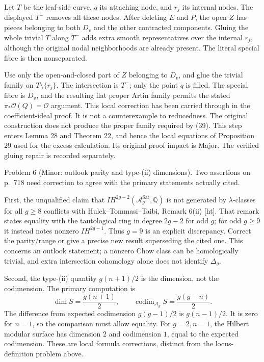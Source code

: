 \documentclass[10pt]{article}
\begin{document}
Let \(T\) be the leaf-side curve, \(q\) its attaching node, and \(r_j\) its internal nodes. The displayed \(T^-\) removes all these nodes. After deleting \(E\) and \(P\), the open \(Z\) has pieces belonging to both \(D_v\) and the other contracted components. Gluing the whole trivial \(T\) along \(T^-\) adds extra smooth representatives over the internal \(r_j\), although the original nodal neighborhoods are already present. The literal special fibre is then nonseparated.\par
Use only the open-and-closed part of \(Z\) belonging to \(D_v\), and glue the trivial family on \(T\setminus\{r_j\}\). The intersection is \(T^-\); only the point \(q\) is filled. The special fibre is \(D_v\), and the resulting flat proper Artin family permits the stated \(\pi_*\mathcal O(Q)=\mathcal O\) argument. This local correction has been carried through in the coefficient-ideal proof. It is not a counterexample to reducedness. The original construction does not produce the proper family required by (39). This step enters Lemma 28 and Theorem 22, and hence the local equations of Proposition 29 used for the excess calculation. Its original proof impact is Major. The verified gluing repair is recorded separately.\par
Problem 6 (Minor: outlook parity and type-(ii) dimensions).  Two assertions on p. 718 need correction to agree with the primary statements actually cited.\par
First, the unqualified claim that \(IH^{2g-2}(\mathcal A_g^{\mathrm{Sat}},\mathbb Q)\) is not generated by \(\lambda\)-classes for all \(g\ge8\) conflicts with Hulek–Tommasi–Taibi, Remark 6(ii) [ht]. That remark states equality with the tautological ring in degree \(2g-2\) for odd \(g\); for odd \(g\ge9\) it instead notes nonzero \(IH^{2g-1}\). Thus \(g=9\) is an explicit discrepancy. Correct the parity/range or give a precise new result superseding the cited one. This concerns an outlook statement; a nonzero Chow class can be homologically trivial, and extra intersection cohomology alone does not identify \(\Delta_g\).\par
Second, the type-(ii) quantity \(g(n+1)/2\) is the dimension, not the codimension. The primary computation is \[\dim S=\frac{g(n+1)}2,\qquad
 \operatorname{codim}_{\mathcal A_g}S=\frac{g(g-n)}2.\] The difference from expected codimension \(g(g-1)/2\) is \(g(n-1)/2\). It is zero for \(n=1\), so the comparison must allow equality. For \(g=2,n=1\), the Hilbert modular surface has dimension \(2\) and codimension \(1\), equal to the expected codimension. These are local formula corrections, distinct from the locus-definition problem above.\par
\end{document}
